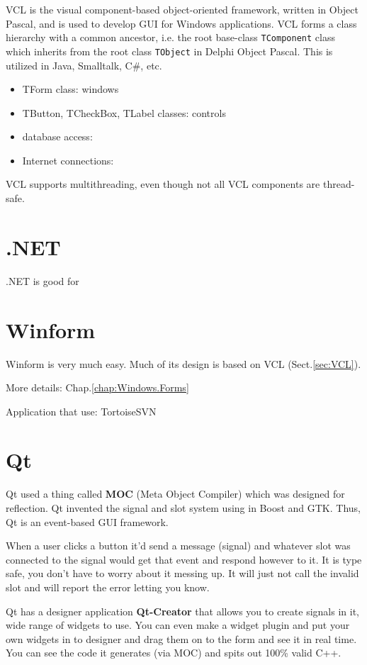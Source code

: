 VCL is the visual component-based object-oriented framework, written in Object
Pascal, and is used to develop GUI for Windows applications.
VCL forms a class hierarchy with a common ancestor, i.e. the root base-class
\verb!TComponent! class which inherits from the root class \verb!TObject! in
Delphi Object Pascal. This is utilized in Java, Smalltalk, C\#, etc.
\begin{itemize}
  \item TForm class: windows
  \item TButton, TCheckBox, TLabel classes: controls
  \item database access: 
  \item Internet connections: 
\end{itemize}

VCL supports multithreading, even though not all VCL components are thread-safe. 

\section{.NET}

.NET is good for

\section{Winform}
\label{sec:Winform}

Winform is very much easy. Much of its design is based on VCL
(Sect.\ref{sec:VCL}).

More details: Chap.\ref{chap:Windows.Forms}

Application that use: TortoiseSVN

\section{Qt}
\label{sec:Qt}

Qt used a thing called {\bf MOC} (Meta Object Compiler) which was designed for reflection. 
Qt invented the signal and slot system using in Boost and GTK. Thus, Qt is an event-based GUI framework.

When a user clicks a button it'd send a message (signal) and whatever slot was
connected to the signal would get that event and respond however to it. It is
type safe, you don't have to worry about it messing up. It will just not call
the invalid slot and will report the error letting you know.


Qt has a designer application {\bf Qt-Creator} that allows you to create signals
in it, wide range of widgets to use.
You can even make a widget plugin and put your own widgets in to designer and
drag them on to the form and see it in real time.
You can see the code it generates (via MOC) and spits out 100\% valid C++.

